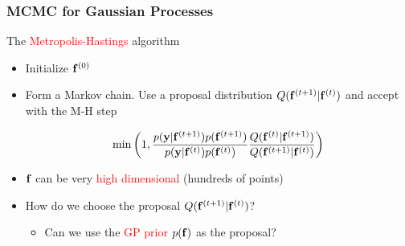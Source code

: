 \documentclass{beamer}
\begin{document}
\frame
{
  \frametitle{MCMC for Gaussian Processes}

The \textcolor{red}{Metropolis-Hastings} algorithm 

  \begin{itemize}

  \item Initialize $\mathbf{f}^{(0)}$

  \item  Form a Markov chain. Use a proposal distribution 
            $Q(\mathbf{f}^{(t+1)}|\mathbf{f}^{(t)})$ and accept with the M-H step 

$$
\min \left(1,\frac{p(\mathbf{y}|\mathbf{f}^{(t+1)}) p(\mathbf{f}^{(t+1)})}
{p(\mathbf{y}|\mathbf{f}^{(t)}) p(\mathbf{f}^{(t)})}  \frac{Q(\mathbf{f}^{(t)}|\mathbf{f}^{(t+1)})}
{Q(\mathbf{f}^{(t+1)}|\mathbf{f}^{(t)})} \right)
$$ 

\item $\mathbf{f}$ can be very \textcolor{red}{high dimensional} (hundreds of points) 

\item How do we choose the proposal $Q(\mathbf{f}^{(t+1)}|\mathbf{f}^{(t)})$? 

\begin{itemize}
\item  Can we use the \textcolor{red}{GP prior $p(\mathbf{f})$} as the proposal?
\end{itemize}

% 
 
\end{itemize}

}
\end{document}
